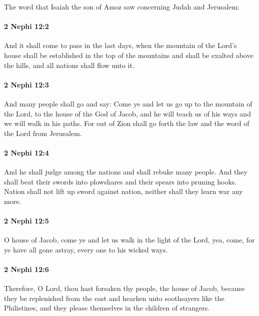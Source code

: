 			The word that Isaiah the son of Amoz saw concerning Judah and Jerusalem:

		\paragraph{2 Nephi 12:2} %
			\label{2NEPHI-12-2}

			And it shall come to pass in the last days,
			when the mountain of the Lord's house
			shall be established in the top of the mountains
			and shall be exalted above the hills,
			and all nations shall flow unto it.

		\paragraph{2 Nephi 12:3} %
			\label{2NEPHI-12-3}

			And many people shall go and say:
			Come ye and let us go up to the mountain of the Lord,
			to the house of the God of Jacob,
			and he will teach us of his ways and we will walk in his paths.
			For out of Zion shall go forth the law
			and the word of the Lord from Jerusalem.

		\paragraph{2 Nephi 12:4} %
			\label{2NEPHI-12-4}

			And he shall judge among the nations and shall rebuke many people.
			And they shall beat their swords into plowshares
			and their spears into pruning hooks.
			Nation shall not lift up sword against nation,
			neither shall they learn war any more.

		\paragraph{2 Nephi 12:5} %
			\label{2NEPHI-12-5}

			O house of Jacob, come ye and let us walk in the light of the Lord,
			yea, come, for ye have all gone astray, every one to his wicked ways.

		\paragraph{2 Nephi 12:6} %
			\label{2NEPHI-12-6}

			Therefore, O Lord, thou hast forsaken thy people, the house of Jacob,
			because they be replenished from the east
			and hearken unto soothsayers like the Philistines,
			and they please themselves in the children of strangers.

